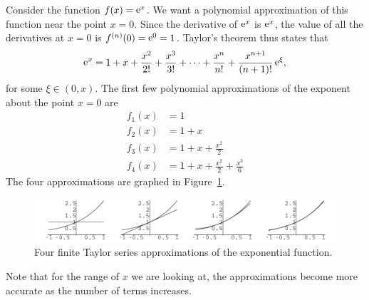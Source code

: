 \begin{Example}
  Consider the function $f(x) = \mathop{\mathrm{e}}\nolimits^x$.  We want a polynomial approximation of
  this function near the point $x = 0$.  Since the derivative of $\mathop{\mathrm{e}}\nolimits^x$ is
  $\mathop{\mathrm{e}}\nolimits^x$, the value of all the derivatives at $x = 0$ is $f^{(n)}(0) = \mathop{\mathrm{e}}\nolimits^0 = 1$.
  Taylor's theorem thus states that
  \[
  \mathop{\mathrm{e}}\nolimits^x = 1 + x + \frac{x^2}{2!} + \frac{x^3}{3!} + \cdots + \frac{x^n}{n!}
  + \frac{x^{n+1}}{(n+1)!} \mathop{\mathrm{e}}\nolimits^\xi,
  \]
  for some $\xi \in (0,x)$.  The first few polynomial approximations of 
  the exponent about the point $x = 0$ are 
  \begin{align*}
    f_1(x) &= 1 \\
    f_2(x) &= 1 + x \\
    f_3(x) &= 1 + x + \frac{x^2}{2} \\
    f_4(x) &= 1 + x + \frac{x^2}{2} + \frac{x^3}{6} 
  \end{align*}
  The four approximations are graphed in Figure~\ref{tayexp4}.

  \begin{figure}[h!]
    \begin{center}
      \includegraphics[width=\textwidth]{calculus/differential/tayexp4}
    \end{center}
    \caption{Four finite Taylor series approximations of the 
      exponential function.}
    \label{tayexp4}
  \end{figure}

  Note that for the range of $x$ we are looking at, the approximations
  become more accurate as the number of terms increases.
\end{Example}









